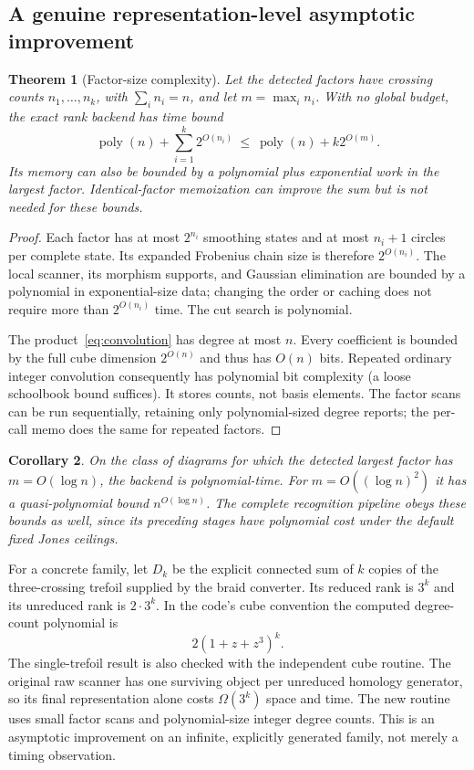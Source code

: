 \documentclass[11pt,letterpaper]{article}
\newtheorem{theorem}{Theorem}[section]
\newtheorem{corollary}[theorem]{Corollary}
\theoremstyle{definition}
\newcommand{\poly}{\operatorname{poly}}
\begin{document}
\subsection{A genuine representation-level asymptotic improvement}

\begin{theorem}[Factor-size complexity]\label{thm:factors}
Let the detected factors have crossing counts $n_1,\ldots,n_k$, with
$\sum_i n_i=n$, and let $m=\max_i n_i$. With no global budget, the exact rank
backend has time bound
\begin{equation}\label{eq:factorbound}
 \poly(n)+\sum_{i=1}^k2^{O(n_i)}
 \ \leq\ \poly(n)+k2^{O(m)}.
\end{equation}
Its memory can also be bounded by a polynomial plus exponential work in the
largest factor. Identical-factor memoization can improve the sum but is not
needed for these bounds.
\end{theorem}
\begin{proof}
Each factor has at most $2^{n_i}$ smoothing states and at most $n_i+1$ circles
per complete state. Its expanded Frobenius chain size is therefore
$2^{O(n_i)}$. The local scanner, its morphism supports, and Gaussian elimination
are bounded by a polynomial in exponential-size data; changing the order or
caching does not require more than $2^{O(n_i)}$ time. The cut search is polynomial.

The product~\eqref{eq:convolution} has degree at most $n$. Every coefficient is
bounded by the full cube dimension $2^{O(n)}$ and thus has $O(n)$ bits. Repeated
ordinary integer convolution consequently has polynomial bit complexity (a
loose schoolbook bound suffices). It stores counts, not basis elements. The
factor scans can be run sequentially, retaining only polynomial-sized degree
reports; the per-call memo does the same for repeated factors.
\end{proof}

\begin{corollary}
On the class of diagrams for which the detected largest factor has
$m=O(\log n)$, the backend is polynomial-time. For $m=O((\log n)^2)$ it has a
quasi-polynomial bound $n^{O(\log n)}$. The complete recognition pipeline obeys
these bounds as well, since its preceding stages have polynomial cost under the
default fixed Jones ceilings.
\end{corollary}

For a concrete family, let $D_k$ be the explicit connected sum of $k$ copies of
the three-crossing trefoil supplied by the braid converter. Its reduced rank is
$3^k$ and its unreduced rank is $2\cdot3^k$. In the code's cube convention the
computed degree-count polynomial is
\[
 2(1+z+z^3)^k.
\]
The single-trefoil result is also checked with the independent cube routine.
The original raw scanner has one surviving object per unreduced homology
generator, so its final representation alone costs $\Omega(3^k)$ space and time.
The new routine uses small factor scans and polynomial-size integer degree
counts. This is an asymptotic improvement on an infinite, explicitly generated
family, not merely a timing observation.
\end{document}
